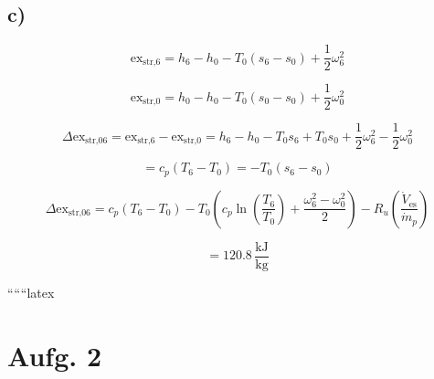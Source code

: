 

\subsection*{c)}

\[
\text{ex}_{\text{str,6}} = h_6 - h_0 - T_0 (s_6 - s_0) + \frac{1}{2} \omega_6^2
\]

\[
\text{ex}_{\text{str,0}} = h_0 - h_0 - T_0 (s_0 - s_0) + \frac{1}{2} \omega_0^2
\]

\[
\Delta \text{ex}_{\text{str,06}} = \text{ex}_{\text{str,6}} - \text{ex}_{\text{str,0}} = h_6 - h_0 - T_0 s_6 + T_0 s_0 + \frac{1}{2} \omega_6^2 - \frac{1}{2} \omega_0^2
\]

\[
= c_p (T_6 - T_0) = -T_0 (s_6 - s_0)
\]

\[
\Delta \text{ex}_{\text{str,06}} = c_p (T_6 - T_0) - T_0 \left( c_p \ln \left( \frac{T_6}{T_0} \right) + \frac{\omega_6^2 - \omega_0^2}{2} \right) - R_u \left( \frac{\dot{V}_{\text{es}}}{\dot{m}_p} \right)
\]

\[
= 120.8 \, \frac{\text{kJ}}{\text{kg}}
\]

``````latex

\section*{Aufg. 2}